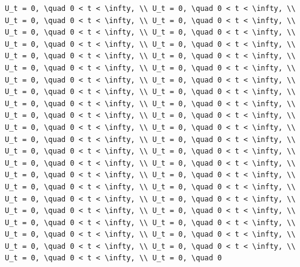 \documentclass[
  ukrainian,
]{article}
\begin{document}
\begin{verbatim}
U_t = 0, \quad 0 < t < \infty, \\ U_t = 0, \quad 0 < t < \infty, \\ U_t = 0, \quad 0 < t < \infty, \\ U_t = 0, \quad 0 < t < \infty, \\ U_t = 0, \quad 0 < t < \infty, \\ U_t = 0, \quad 0 < t < \infty, \\ U_t = 0, \quad 0 < t < \infty, \\ U_t = 0, \quad 0 < t < \infty, \\ U_t = 0, \quad 0 < t < \infty, \\ U_t = 0, \quad 0 < t < \infty, \\ U_t = 0, \quad 0 < t < \infty, \\ U_t = 0, \quad 0 < t < \infty, \\ U_t = 0, \quad 0 < t < \infty, \\ U_t = 0, \quad 0 < t < \infty, \\ U_t = 0, \quad 0 < t < \infty, \\ U_t = 0, \quad 0 < t < \infty, \\ U_t = 0, \quad 0 < t < \infty, \\ U_t = 0, \quad 0 < t < \infty, \\ U_t = 0, \quad 0 < t < \infty, \\ U_t = 0, \quad 0 < t < \infty, \\ U_t = 0, \quad 0 < t < \infty, \\ U_t = 0, \quad 0 < t < \infty, \\ U_t = 0, \quad 0 < t < \infty, \\ U_t = 0, \quad 0 < t < \infty, \\ U_t = 0, \quad 0 < t < \infty, \\ U_t = 0, \quad 0 < t < \infty, \\ U_t = 0, \quad 0 < t < \infty, \\ U_t = 0, \quad 0 < t < \infty, \\ U_t = 0, \quad 0 < t < \infty, \\ U_t = 0, \quad 0 < t < \infty, \\ U_t = 0, \quad 0 < t < \infty, \\ U_t = 0, \quad 0 < t < \infty, \\ U_t = 0, \quad 0 < t < \infty, \\ U_t = 0, \quad 0 < t < \infty, \\ U_t = 0, \quad 0 < t < \infty, \\ U_t = 0, \quad 0 < t < \infty, \\ U_t = 0, \quad 0 < t < \infty, \\ U_t = 0, \quad 0 < t < \infty, \\ U_t = 0, \quad 0 < t < \infty, \\ U_t = 0, \quad 0 < t < \infty, \\ U_t = 0, \quad 0 < t < \infty, \\ U_t = 0, \quad 0 < t < \infty, \\ U_t = 0, \quad 0 < t < \infty, \\ U_t = 0, \quad 0 
\end{verbatim}
\end{document}
